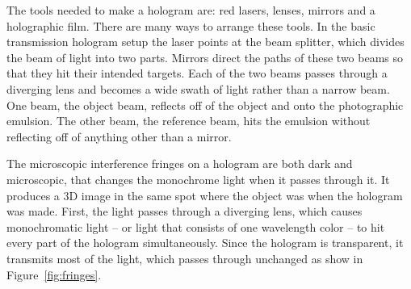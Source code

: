 


 
The tools needed to make a hologram are: red lasers, lenses, mirrors and a holographic film. There are many ways to arrange these tools. In the basic transmission hologram setup the laser points at the beam splitter, which divides the beam of light into two parts.
Mirrors direct the paths of these two beams so that they hit their intended targets.
Each of the two beams passes through a diverging lens and becomes a wide swath of light rather than a narrow beam.
One beam, the object beam, reflects off of the object and onto the photographic emulsion.
The other beam, the reference beam, hits the emulsion without reflecting off of anything other than a mirror.

The microscopic interference fringes on a hologram are both dark and microscopic, that changes the monochrome light when it passes through it. It produces a 3D image in the same spot where the object was when the hologram was made. First, the light passes through a diverging lens, which causes monochromatic light -- or light that consists of one wavelength color -- to hit every part of the hologram simultaneously. Since the hologram is transparent, it transmits most of the light, which passes through unchanged as show in Figure~\ref{fig:fringes}.

